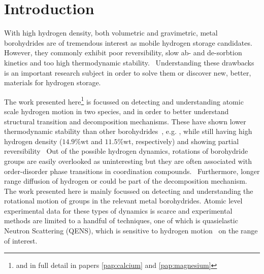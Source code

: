 \section{Introduction}
\label{sec:borohydrides-introduction}


With high hydrogen density, both volumetric and gravimetric, metal borohydrides are of tremendous interest as mobile hydrogen storage candidates.
However, they commonly exhibit poor reversibility, slow ab- and de-sorbtion kinetics and too high thermodynamic stability.~\cite{lithium-stability-2003, borohydride-stability-2006, calcium-stability-2006}
Understanding these drawbacks is an important research subject in order to solve them or discover new, better, materials for hydrogen storage.

The work presented here\footnote{and in full detail in papers \ref{pap:calcium} and \ref{pap:magnesium}} is focussed on detecting and understanding atomic scale hydrogen motion in two species,  and  in order to better understand structural transition and decomposition mechanisms.
These have shown lower thermodynamic stability than other borohydrides~\cite{borohydride-stability-2006, calcium-stability-2006}, e.g. , while still having high hydrogen density ($14.9\%\text{wt}$ and $11.5\%\text{wt}$, respectively) and showing partial reversibility~\cite{magnesium-reversibility-severa-2010, magnesium-reversibility-chong-2011, calcium-reversibility-2007, calcium-reversibility-2008, reversibility-destabilisation-2008}
Out of the possible hydrogen dynamics, rotations of borohydride groups are easily overlooked as uninteresting but they are often associated with order-disorder phase transitions in coordination compounds.~\cite{order-disorder-2006, order-disorder-2010}
Furthermore, longer range diffusion of hydrogen or  could be part of the decomposition mechanism.
The work presented here is mainly focussed on detecting and understanding the rotational motion of  groups in the relevant metal borohydrides.
Atomic level experimental data for these types of dynamics is scarce and experimental methods are limited to a handful of techniques, one of which is quasielastic Neutron Scattering (QENS), which is sensitive to hydrogen motion~\cite{qens-bee-1988} on the range of interest. %

